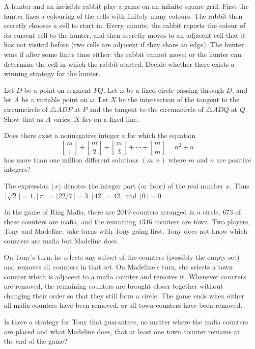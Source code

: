 \documentclass[11pt]{scrartcl}
\begin{document}
\begin{problem}[3470579368412517052]
	A hunter and an invisible rabbit play a game on an infinite square grid. First the hunter fixes a colouring of the cells with finitely many colours. The rabbit then secretly chooses a cell to start in. Every minute, the rabbit reports the colour of its current cell to the hunter, and then secretly moves to an adjacent cell that it has not visited before (two cells are adjacent if they share an edge). The hunter wins if after some finite time either:
the rabbit cannot move; or
the hunter can determine the cell in which the rabbit started.
Decide whether there exists a winning strategy for the hunter.
\end{problem}
\begin{problem}[8152181601565653036]
Let \(D\) be a point on segment \(PQ\). Let \(\omega\) be a fixed circle passing through \(D\), and let \(A\) be a variable point on \(\omega\). Let \(X\) be the intersection of the tangent to the circumcircle of \(\triangle ADP\) at \(P\) and the tangent to the circumcircle of \(\triangle ADQ\) at \(Q\). Show that as \(A\) varies, \(X\) lies on a fixed line.
\end{problem}
\begin{problem}[6287115858827066074]
Does there exist a nonnegative integer $a$ for which the equation
\[\left\lfloor\frac{m}{1}\right\rfloor + \left\lfloor\frac{m}{2}\right\rfloor + \left\lfloor\frac{m}{3}\right\rfloor + \cdots + \left\lfloor\frac{m}{m}\right\rfloor = n^2 + a\]has more than one million different solutions $(m, n)$ where $m$ and $n$ are positive integers?

The expression $\lfloor x\rfloor$ denotes the integer part (or floor) of the real number $x$. Thus $\lfloor\sqrt{2}\rfloor = 1, \lfloor\pi\rfloor =\lfloor 22/7 \rfloor = 3, \lfloor 42\rfloor = 42,$ and $\lfloor 0 \rfloor = 0$.
\end{problem}
\begin{problem}[255228327462897]
In the game of Ring Mafia, there are $2019$ counters arranged in a circle. $673$ of these counters are mafia, and the remaining $1346$ counters are town. Two players, Tony and Madeline, take turns with Tony going first. Tony does not know which counters are mafia but Madeline does.

On Tony’s turn, he selects any subset of the counters (possibly the empty set) and removes all counters in that set. On Madeline’s turn, she selects a town counter which is adjacent to a mafia counter and removes it. Whenever counters are removed, the remaining counters are brought closer together without changing their order so that they still form a circle. The game ends when either all mafia counters have been removed, or all town counters have been removed.

Is there a strategy for Tony that guarantees, no matter where the mafia counters are placed and what Madeline does, that at least one town counter remains at the end of the game?
\end{problem}
\end{document}
